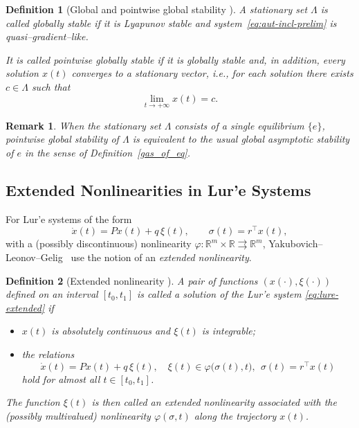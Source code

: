 \documentclass[journal]{IEEEtran}
\newtheorem{definition}{Definition}
\newtheorem{remark}{Remark}
\begin{document}
\begin{definition}[Global and pointwise global stability
{\cite[Defs.~1.13--1.14]{YLG}}]
A stationary set $\Lambda$ is called \emph{globally stable} if it is
Lyapunov stable and system~\eqref{eq:aut-incl-prelim} is
quasi–gradient–like.

It is called \emph{pointwise globally stable} if it is globally stable
and, in addition, every solution $x(t)$ converges to a stationary
vector, i.e., for each solution there exists $c\in\Lambda$ such that
\[
   \lim_{t\to+\infty} x(t) = c.
\]
\end{definition}

\begin{remark}
When the stationary set $\Lambda$ consists of a single equilibrium
$\{e\}$, pointwise global stability of $\Lambda$ is equivalent to the
usual \emph{global asymptotic stability} of $e$ in the sense of
Definition~\ref{gas_of_eq}.
\end{remark}

\subsection{Extended Nonlinearities in Lur'e Systems}
\label{subsec:extended-nonlinearity}

For Lur'e systems of the form
\begin{equation}
  \dot x(t) = P x(t) + q\,\xi(t), \qquad
  \sigma(t) = r^{\top}x(t),
  \label{eq:lure-extended}
\end{equation}
with a (possibly discontinuous) nonlinearity
$\varphi \!:\!\mathbb{R}^m \! \times\mathbb{R}\rightrightarrows\mathbb{R}^m$,
Yakubovich--Leonov--Gelig~\cite{YLG} use the notion of an \emph{extended
nonlinearity}.

\begin{definition}[Extended nonlinearity {\cite[Sec.~1.2]{YLG}}]
A pair of functions $(x(\cdot),\xi(\cdot))$ defined on an interval
$[t_0,t_1]$ is called a solution of the Lur'e system
\eqref{eq:lure-extended} if
\begin{itemize}
  \item $x(t)$ is absolutely continuous and $\xi(t)$ is integrable;
  \item the relations
  \[
     \dot x(t) = P x(t) + q\,\xi(t), \quad
     \xi(t) \in \varphi\bigl(\sigma(t),t\bigr),\ \
     \sigma(t)=r^{\top}x(t)
  \]
  hold for almost all $t\in[t_0,t_1]$.
\end{itemize}
The function $\xi(t)$ is then called an \emph{extended nonlinearity}
associated with the (possibly multivalued) nonlinearity
$\varphi(\sigma,t)$ along the trajectory $x(t)$.
\end{definition}
\end{document}
